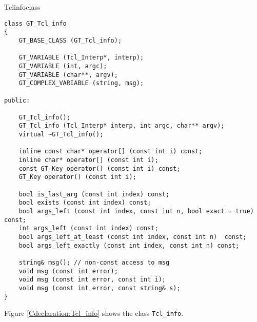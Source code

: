 \documentclass[twoside,fleqn]{report}
\begin{document}
\begin{Cdeclaration}{Tclinfo}{class }
\begin{verbatim}
class GT_Tcl_info
{
    GT_BASE_CLASS (GT_Tcl_info);
        
    GT_VARIABLE (Tcl_Interp*, interp);
    GT_VARIABLE (int, argc);
    GT_VARIABLE (char**, argv);
    GT_COMPLEX_VARIABLE (string, msg);
        
public:

    GT_Tcl_info();
    GT_Tcl_info (Tcl_Interp* interp, int argc, char** argv);
    virtual ~GT_Tcl_info();

    inline const char* operator[] (const int i) const;
    inline char* operator[] (const int i);
    const GT_Key operator() (const int i) const;
    GT_Key operator() (const int i);
    
    bool is_last_arg (const int index) const;
    bool exists (const int index) const;
    bool args_left (const int index, const int n, bool exact = true) const;
    int args_left (const int index) const;
    bool args_left_at_least (const int index, const int n)  const;
    bool args_left_exactly (const int index, const int n) const;
        
    string& msg(); // non-const access to msg
    void msg (const int error);
    void msg (const int error, const int i);
    void msg (const int error, const string& s);
}
\end{verbatim}
\end{Cdeclaration}

Figure \ref{Cdeclaration:Tcl_info} shows the class \texttt{Tcl\_info}.
\end{document}

